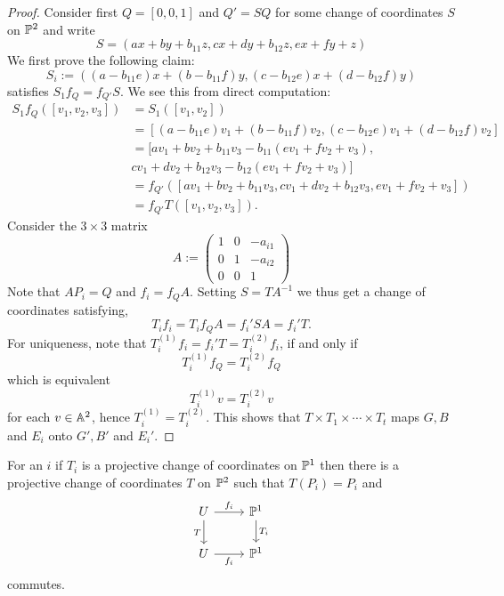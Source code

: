     \begin{proof}
        Consider first $Q=[0,0,1]$ and $Q' = SQ$ for some change of coordinates $S$ on $\mathbb{P}^2$ and write
        $$
            S = (ax+by+b_{11}z,cx+dy+b_{12}z,ex+fy+z)
        $$
        We first prove the following claim: 
        $$
            S_i := ((a-b_{11}e)x+(b-b_{11}f)y,(c-b_{12}e)x+(d-b_{12}f)y)
        $$
        satisfies $S_1f_Q = f_{Q'}S$. We see this from direct computation: 
        \begin{align*}
            S_1f_Q([v_1,v_2,v_3]) &=S_1([v_1,v_2])\\
            &= [(a-b_{11}e)v_1+(b-b_{11}f)v_2,(c-b_{12}e)v_1+(d-b_{12}f)v_2]\\
            &= [av_1+bv_2+b_11v_3-b_{11}(e v_1+fv_2+v_3),\\ & cv_1+dv_2+b_{12}v_3- b_{12}(ev_1+fv_2+v_3)]\\
            &= f_{Q'}([av_1+b v_2+b_{11}v_3, cv_1+dv_2+b_{12}v_3,ev_1+fv_2+v_3])\\
            &= f_{Q'}T([v_1,v_2,v_3]).
        \end{align*}
        Consider the $3\times 3$ matrix 
        $$
           A:= \begin{pmatrix}
                1 & 0 & -a_{i1}\\
                0 & 1 & -a_{i2}\\
                0 & 0 & 1
            \end{pmatrix}
        $$
        Note that $A P_i =Q$ and $f_i = f_Q A$. Setting $S= TA^{-1}$ we thus get a change of coordinates satisfying,
        $$
            T_if_i = T_i f_QA=f_i'S A= f_i'T.
        $$
        For uniqueness, note that $T_i^{(1)}f_i = f_i'T=T_i^{(2)} f_i$, if and only if 
        $$
            T_i^{(1)}f_Q = T_i^{(2)}f_Q
        $$
        which is equivalent
        $$
            T_i^{(1)}v = T_i^{(2)}v
        $$
        for each $v\in \mathbb{A}^2$, hence $T_i^{(1)}=T_i^{(2)}$. This shows that $T\times T_1\times \cdots \times T_t$ maps $G,B$ and $E_i$ onto $G',B'$ and $E_i'$. 
    \end{proof}
    \begin{lemma}
        For an $i$ if $T_i$ is a projective change of coordinates on $\mathbb{P}^1$ then there is a projective change of coordinates $T$ on $\mathbb{P}^2$ such that $T(P_i)=P_i$ and 
        $$
            \begin{tikzcd}
                U \arrow[r,"f_i"]\arrow[d,"T",swap] & \Pp^1\arrow[d,"T_i"] \\
                U \arrow[r,"f_i",swap] & \Pp^1
            \end{tikzcd}
        $$
        commutes.
    \end{lemma}
